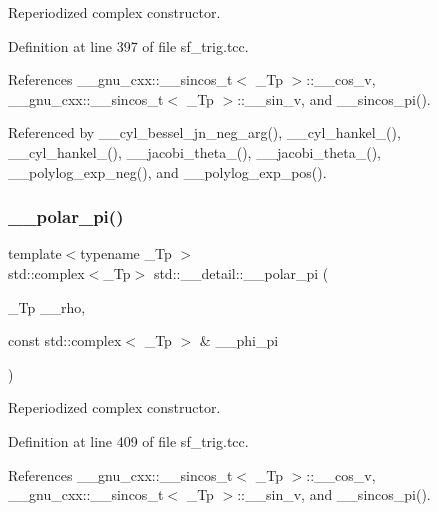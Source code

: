 Reperiodized complex constructor. 

Definition at line 397 of file sf\+\_\+trig.\+tcc.



References \+\_\+\+\_\+gnu\+\_\+cxx\+::\+\_\+\+\_\+sincos\+\_\+t$<$ \+\_\+\+Tp $>$\+::\+\_\+\+\_\+cos\+\_\+v, \+\_\+\+\_\+gnu\+\_\+cxx\+::\+\_\+\+\_\+sincos\+\_\+t$<$ \+\_\+\+Tp $>$\+::\+\_\+\+\_\+sin\+\_\+v, and \+\_\+\+\_\+sincos\+\_\+pi().



Referenced by \+\_\+\+\_\+cyl\+\_\+bessel\+\_\+jn\+\_\+neg\+\_\+arg(), \+\_\+\+\_\+cyl\+\_\+hankel\+\_(), \+\_\+\+\_\+cyl\+\_\+hankel\+\_(), \+\_\+\+\_\+jacobi\+\_\+theta\+\_(), \+\_\+\+\_\+jacobi\+\_\+theta\+\_(), \+\_\+\+\_\+polylog\+\_\+exp\+\_\+neg(), and \+\_\+\+\_\+polylog\+\_\+exp\+\_\+pos().

\mbox{\label{namespacestd_1_1____detail_a627c0e19f6b3e90af25735f351662d53}} 
\subsubsection{\texorpdfstring{\+\_\+\+\_\+polar\+\_\+pi()}{\_\_polar\_pi()}\hspace{0.1cm}{\footnotesize\ttfamily [2/2]}}
{\footnotesize\ttfamily template$<$typename \+\_\+\+Tp $>$ \\
std\+::complex$<$\+\_\+\+Tp$>$ std\+::\+\_\+\+\_\+detail\+::\+\_\+\+\_\+polar\+\_\+pi (\begin{DoxyParamCaption}\item[{\+\_\+\+Tp}]{\+\_\+\+\_\+rho,  }\item[{const std\+::complex$<$ \+\_\+\+Tp $>$ \&}]{\+\_\+\+\_\+phi\+\_\+pi }\end{DoxyParamCaption})\hspace{0.3cm}{\ttfamily [inline]}}

Reperiodized complex constructor. 

Definition at line 409 of file sf\+\_\+trig.\+tcc.



References \+\_\+\+\_\+gnu\+\_\+cxx\+::\+\_\+\+\_\+sincos\+\_\+t$<$ \+\_\+\+Tp $>$\+::\+\_\+\+\_\+cos\+\_\+v, \+\_\+\+\_\+gnu\+\_\+cxx\+::\+\_\+\+\_\+sincos\+\_\+t$<$ \+\_\+\+Tp $>$\+::\+\_\+\+\_\+sin\+\_\+v, and \+\_\+\+\_\+sincos\+\_\+pi().

